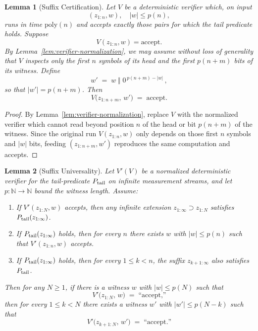 \documentclass[12pt]{article}
\theoremstyle{definition}
\theoremstyle{plain}
\newtheorem{lemma}{Lemma}[section]
\begin{document}
\begin{lemma}[Suffix Certification]
\label{lem:suffix-cert}
Let $V$ be a deterministic verifier which, on input 
\[
  (z_{1:n},w),\quad |w|\le p(n),
\]
runs in time $\mathrm{poly}(n)$ and accepts exactly those pairs for which the tail predicate holds.  Suppose 
\[
  V(z_{1:n},w)=\text{accept}.
\]
By Lemma~\ref{lem:verifier-normalization}, we may assume without loss of generality that $V$ inspects only the first $n$ symbols of its head and the first $p(n+m)$ bits of its witness.  Define
\[
  w' \;=\; w \;\Vert\; 0^{\,p(n+m)-|w|}\,,
\]
so that $|w'|=p(n+m)$.  Then
\[
  V\bigl(z_{1:n+m},\,w'\bigr)
  \;=\;\text{accept}.
\]
\end{lemma}

\begin{proof}
By Lemma~\ref{lem:verifier-normalization}, replace $V$ with the normalized verifier which cannot read beyond position $n$ of the head or bit $p(n+m)$ of the witness.  Since the original run $V(z_{1:n},w)$ only depends on those first $n$ symbols and $|w|$ bits, feeding $(z_{1:n+m},w')$ reproduces the same computation and accepts.
\end{proof}

\begin{lemma}[Suffix Universality]\label{lem:suffix-univ}
Let \(V'(V)\) be a normalized deterministic verifier for the tail‐predicate \(P_{\rm tail}\) on infinite measurement streams, and let \(p:\mathbb{N}\to\mathbb{N}\) bound the witness length.  Assume:
\begin{enumerate}
  \item[(i) Soundness\phantom{ity}] 
    If \(V'(z_{1:N},w)\) accepts, then any infinite extension \(z_{1:\infty}\supset z_{1:N}\) satisfies \(P_{\rm tail}(z_{1:\infty})\).
  \item[(ii) Completeness] 
    If \(P_{\rm tail}(z_{1:\infty})\) holds, then for every \(n\) there exists \(w\) with \(\lvert w\rvert \le p(n)\) such that \(V'(z_{1:n},w)\) accepts.
  \item[(iii) Tail–Invariance] 
    If \(P_{\rm tail}(z_{1:\infty})\) holds, then for every \(1\le k<n\), the suffix \(z_{k+1:\infty}\) also satisfies \(P_{\rm tail}\).
\end{enumerate}
Then for any \(N\ge1\), if there is a witness \(w\) with \(\lvert w\rvert\le p(N)\) such that
\[
  V'\bigl(z_{1:N},\,w\bigr)\;=\;\text{``accept,''}
\]
then for every \(1 \le k < N\) there exists a witness \(w'\) with \(\lvert w'\rvert \le p(N-k)\) such that
\[
  V'\bigl(z_{k+1:N},\,w'\bigr)\;=\;\text{``accept.''}
\]
\end{lemma}
\end{document}
